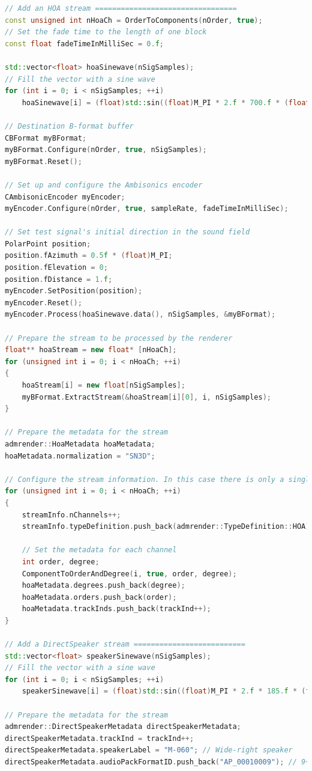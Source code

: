 \documentclass[12pt]{report}
\begin{document}
\begin{lstlisting}[language=C++]
// Add an HOA stream =================================
const unsigned int nHoaCh = OrderToComponents(nOrder, true);
// Set the fade time to the length of one block
const float fadeTimeInMilliSec = 0.f;

std::vector<float> hoaSinewave(nSigSamples);
// Fill the vector with a sine wave
for (int i = 0; i < nSigSamples; ++i)
    hoaSinewave[i] = (float)std::sin((float)M_PI * 2.f * 700.f * (float)i / (float)sampleRate);

// Destination B-format buffer
CBFormat myBFormat;
myBFormat.Configure(nOrder, true, nSigSamples);
myBFormat.Reset();

// Set up and configure the Ambisonics encoder
CAmbisonicEncoder myEncoder;
myEncoder.Configure(nOrder, true, sampleRate, fadeTimeInMilliSec);

// Set test signal's initial direction in the sound field
PolarPoint position;
position.fAzimuth = 0.5f * (float)M_PI;
position.fElevation = 0;
position.fDistance = 1.f;
myEncoder.SetPosition(position);
myEncoder.Reset();
myEncoder.Process(hoaSinewave.data(), nSigSamples, &myBFormat);

// Prepare the stream to be processed by the renderer
float** hoaStream = new float* [nHoaCh];
for (unsigned int i = 0; i < nHoaCh; ++i)
{
    hoaStream[i] = new float[nSigSamples];
    myBFormat.ExtractStream(&hoaStream[i][0], i, nSigSamples);
}

// Prepare the metadata for the stream
admrender::HoaMetadata hoaMetadata;
hoaMetadata.normalization = "SN3D";

// Configure the stream information. In this case there is only a single HOA stream of (nOrder + 1)^2 channels
for (unsigned int i = 0; i < nHoaCh; ++i)
{
    streamInfo.nChannels++;
    streamInfo.typeDefinition.push_back(admrender::TypeDefinition::HOA);

    // Set the metadata for each channel
    int order, degree;
    ComponentToOrderAndDegree(i, true, order, degree);
    hoaMetadata.degrees.push_back(degree);
    hoaMetadata.orders.push_back(order);
    hoaMetadata.trackInds.push_back(trackInd++);
}

// Add a DirectSpeaker stream ==========================
std::vector<float> speakerSinewave(nSigSamples);
// Fill the vector with a sine wave
for (int i = 0; i < nSigSamples; ++i)
    speakerSinewave[i] = (float)std::sin((float)M_PI * 2.f * 185.f * (float)i / (float)sampleRate);

// Prepare the metadata for the stream
admrender::DirectSpeakerMetadata directSpeakerMetadata;
directSpeakerMetadata.trackInd = trackInd++;
directSpeakerMetadata.speakerLabel = "M-060"; // Wide-right speaker
directSpeakerMetadata.audioPackFormatID.push_back("AP_00010009"); // 9+10+3 layout


\end{lstlisting}
\end{document}
